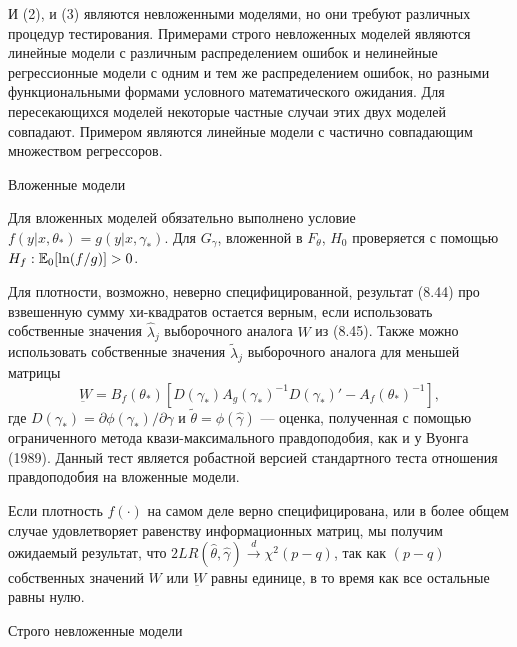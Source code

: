 И (2), и (3) являются невложенными моделями, но они требуют различных процедур тестирования. Примерами строго невложенных моделей являются линейные модели с различным распределением ошибок и нелинейные регрессионные модели с одним и тем же распределением ошибок, но разными функциональными формами условного математического ожидания. Для пересекающихся моделей некоторые частные случаи этих двух моделей совпадают. Примером являются линейные модели с частично совпадающим множеством регрессоров.

\begin{center}
Вложенные модели
\end{center}

Для вложенных моделей обязательно выполнено условие $f(y|x, \theta_*) = g(y|x, \gamma_*)$. Для $G_{\gamma}$, вложенной в $F_{\theta}$, $H_0$ проверяется с помощью $H_f: \mathbb{E}_0[\ln (f/g)] > 0$.

Для плотности, возможно, неверно специфицированной, результат (8.44) про взвешенную сумму хи-квадратов остается верным, если использовать собственные значения $\hat{\lambda}_j$ выборочного аналога $W$ из (8.45). Также можно использовать собственные значения $\tilde{\lambda}_j$ выборочного аналога для меньшей матрицы
\[
\underbar{W} = B_f(\theta_*)[D(\gamma_*)A_g(\gamma_*)^{-1}D(\gamma_*)' - A_f(\theta_*)^{-1}],
\]
где $D(\gamma_*) = \partial{\phi(\gamma_*)}/\partial{\gamma}$ и $\tilde{\theta} = \phi(\hat{\gamma})$ --- оценка, полученная с помощью ограниченного метода квази-максимального правдоподобия, как и у Вуонга (1989). Данный тест является робастной версией стандартного теста отношения правдоподобия на вложенные модели.

Если плотность $f(\cdot)$ на самом деле верно специфицирована, или в более общем случае удовлетворяет
равенству информационных матриц, мы получим ожидаемый результат, что $2LR(\hat{\theta}, \hat{\gamma}) \stackrel{d}{\rightarrow} \chi^2(p - q)$, так как $(p - q)$ собственных значений $W$ или $\underbar{W}$ равны единице, в то время как все остальные равны нулю.

\begin{center}
Строго невложенные модели
\end{center}

